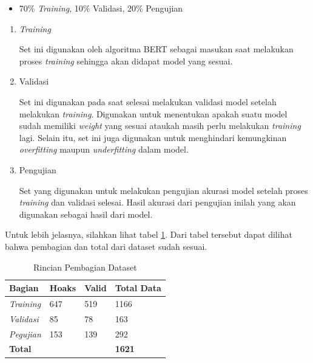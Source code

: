 \begin{itemize}
    \item 70\% \textit{Training}, 10\% Validasi, 20\% Pengujian
\end{itemize}

\begin{enumerate}
    \item \textit{Training}

          Set ini digunakan oleh algoritma BERT sebagai masukan saat melakukan proses \textit{training} sehingga akan didapat model yang sesuai.

    \item Validasi

          Set ini digunakan pada saat selesai melakukan validasi model setelah melakukan \textit{training}. Digunakan untuk menentukan apakah suatu model sudah memiliki \textit{weight} yang sesuai ataukah masih perlu melakukan \textit{training} lagi. Selain itu, set ini juga digunakan untuk menghindari kemungkinan \textit{overfitting} maupun \textit{underfitting} dalam model.

    \item Pengujian

          Set yang digunakan untuk melakukan pengujian akurasi model setelah proses \textit{training} dan validasi selesai. Hasil akurasi dari pengujian inilah yang akan digunakan sebagai hasil dari model.

\end{enumerate}

Untuk lebih jelasnya, silahkan lihat tabel \ref{tab:dataset_section}. Dari tabel tersebut dapat dilihat bahwa pembagian dan total dari dataset sudah sesuai.

\begin{table}
    \caption{Rincian Pembagian Dataset}
    \label{tab:dataset_section}
    \centering
    \begin{tabular}{ | l | l | l | l | }
        \hline
        \textbf{Bagian}                      & \textbf{Hoaks} & \textbf{Valid} & \textbf{Total Data} \\ \hline
        \textit{Training}                    & 647            & 519            & 1166                \\ \hline
        \textit{Validasi}                    & 85             & 78             & 163                 \\ \hline
        \textit{Pegujian}                    & 153            & 139            & 292                 \\ \hline
        \multicolumn{3}{|l|}{\textbf{Total}} & \textbf{1621}                                         \\ \hline
    \end{tabular}
\end{table}

